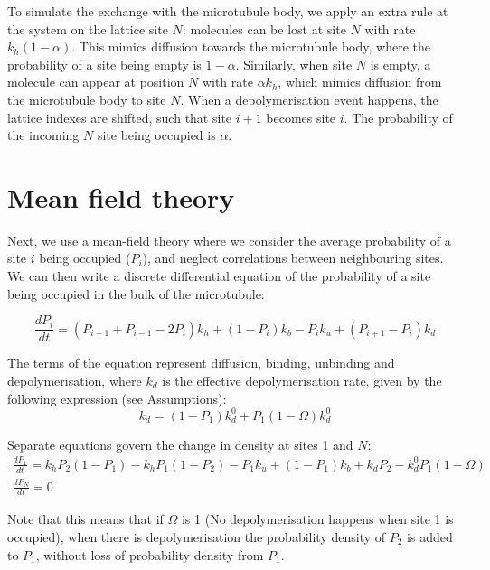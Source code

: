 \documentclass{article}
\begin{document}
To simulate the exchange with the microtubule body, we apply an extra rule at the system on the lattice site $N$: molecules can be lost at site $N$ with rate $k_h(1-\alpha)$. This mimics diffusion towards the microtubule body, where the probability of a site being empty is $1-\alpha$. Similarly, when site $N$ is empty, a molecule can appear at position $N$ with rate $\alpha k_h$, which mimics diffusion from the microtubule body to site $N$.
When a depolymerisation event happens, the lattice indexes are shifted, such that site $i+1$ becomes site $i$. The probability of the incoming $N$ site being occupied is $\alpha$.

\section{Mean field theory}

Next, we use a mean-field theory where we consider the average probability of a site $i$ being occupied ($P_i$), and neglect correlations between neighbouring sites. We can then write a discrete differential equation of the probability of a site being occupied in the bulk of the microtubule:

\begin{equation}
\label{eq:dPi}
\frac{dP_i}{dt} = 
(P_{i+1} + P_{i-1} - 2P_i) k_h   + %
(1-P_i)k_b - P_i k_u   + %
(P_{i+1}-P_i)k_d %
\end{equation}

The terms of the equation represent diffusion, binding,  unbinding and depolymerisation, where $k_d$ is the effective depolymerisation rate, given by the following expression (see Assumptions):
\begin{equation}
\label{eq:k_d}
k_d = (1-P_1)k_d^0 + P_1(1-\Omega)k_d^0
\end{equation}

Separate equations govern the change in density at sites 1 and $N$:
\begin{gather}
\label{eq:dP1}
\frac{dP_1}{dt}=k_h  P_2  (1 - P_1) - k_h  P_1  (1 - P_2) %
 - P_1  k_u + (1 - P_1)  k_b %
 + k_d  P_2 - k_d^0  P_1  (1 - \Omega)\\ 
 \label{eq:dPN}
\frac{dP_N}{dt} = 0
\end{gather}

Note that this means that if $\Omega$ is 1 (No depolymerisation happens when site 1 is occupied), when there is depolymerisation the probability density of $P_2$ is added to $P_1$, without loss of probability density from $P_1$.
\end{document}
